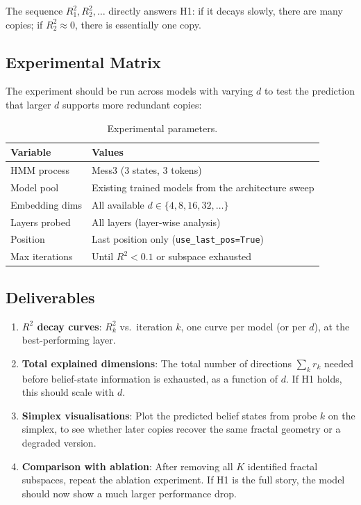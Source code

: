\documentclass[11pt]{article}
\begin{document}
The sequence $R^2_1, R^2_2, \ldots$ directly answers H1: if it decays slowly, there are many copies; if $R^2_2 \approx 0$, there is essentially one copy.

\subsection{Experimental Matrix}

The experiment should be run across models with varying $d$ to test the prediction that larger $d$ supports more redundant copies:

\begin{table}[htbp]
  \centering
  \begin{tabular}{l l}
    \toprule
    Variable & Values \\
    \midrule
    HMM process & Mess3 (3 states, 3 tokens) \\
    Model pool & Existing trained models from the architecture sweep \\
    Embedding dims & All available $d \in \{4, 8, 16, 32, \ldots\}$ \\
    Layers probed & All layers (layer-wise analysis) \\
    Position & Last position only (\texttt{use\_last\_pos=True}) \\
    Max iterations & Until $R^2 < 0.1$ or subspace exhausted \\
    \bottomrule
  \end{tabular}
  \caption{Experimental parameters.}
\end{table}

\subsection{Deliverables}

\begin{enumerate}
  \item \textbf{$R^2$ decay curves}: $R^2_k$ vs.\ iteration $k$, one curve per model (or per $d$), at the best-performing layer.
  \item \textbf{Total explained dimensions}: The total number of directions $\sum_k r_k$ needed before belief-state information is exhausted, as a function of $d$.  If H1 holds, this should scale with $d$.
  \item \textbf{Simplex visualisations}: Plot the predicted belief states from probe $k$ on the simplex, to see whether later copies recover the same fractal geometry or a degraded version.
  \item \textbf{Comparison with ablation}: After removing all $K$ identified fractal subspaces, repeat the ablation experiment.  If H1 is the full story, the model should now show a much larger performance drop.
\end{enumerate}
\end{document}
